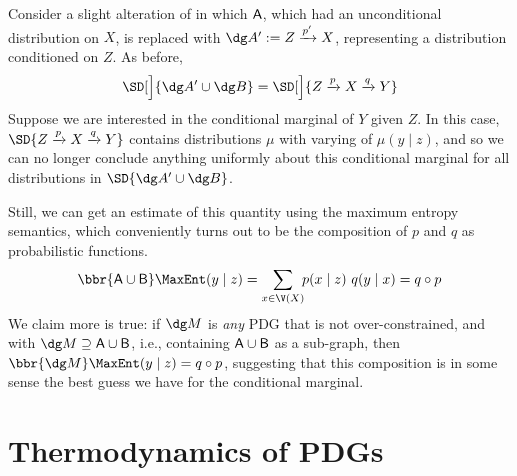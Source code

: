 {    %
    \begin{example}[composition]
    	Consider a slight alteration of  in which $\sf A$, which had an unconditional distribution on $X$, is replaced with $\dg A' := Z \xrightarrow{p'} X$, representing a distribution conditioned on $Z$. 
    	As before,
    	\[ \SD[\Big]{{\dg A' \cup \dg B}} = \SD[\Big]{{Z} \xrightarrow{p} X \xrightarrow{q} Y} \]
    	Suppose we are interested in the conditional marginal of $Y$ given $Z$. In this case, $\SD{{Z} \xrightarrow{p} X \xrightarrow{q} Y} $ contains distributions $\mu$ with varying of $\mu(y \mid z)$, and so we can no longer conclude anything uniformly about this conditional marginal for all distributions in $\SD{{\dg A' \cup \dg B}}$. 
    	
    	Still, we can get an estimate of this quantity using the maximum entropy semantics, which conveniently turns out to be the composition of $p$ and $q$ as probabilistic functions.
    	$$ \bbr{{\sf A \cup B}}\MaxEnt(y \mid z) = \sum_{x \in \V(X)}\!\! p (x \mid z)\ q(y \mid x) = q \circ p $$
    	We claim more is true: if $\dg M$ is \emph{any} PDG that is not over-constrained, and with $\dg M \supseteq \sf A \cup B$, i.e., containing $\sf A \cup B$ as a sub-graph, then
    	$ \bbr{\dg M}\MaxEnt(y \mid z) = q \circ p$,
    	suggesting that this composition is in some sense the best guess we have for the conditional marginal. 
    \end{example}

}%

\section{Thermodynamics of PDGs}\label{sec:thermo}

